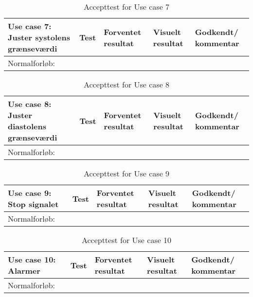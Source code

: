 \begin{table}[h!]
\caption{Accepttest for Use case 7}\label{tab:tabel8}
\begin{tabular}{|>{\raggedright\arraybackslash}p{2.5cm}| >{\raggedright\arraybackslash}p{2.9cm} | >{\raggedright\arraybackslash}p{2.9cm} | >{\raggedright\arraybackslash}p{2.9cm} | >{\raggedright\arraybackslash}p{2.8cm} |}
   \hline
   \textbf{Use case 7: Juster systolens grænseværdi } &\textbf{Test}& \textbf{Forventet resultat} & \textbf{Visuelt resultat} & \textbf{Godkendt/ kommentar}\\ \hline
   Normalforløb:& & & &\\\hline
\end{tabular}
\end{table}


\begin{table}[h!]
\caption{Accepttest for Use case 8}\label{tab:tabel8}
\begin{tabular}{|>{\raggedright\arraybackslash}p{2.5cm}| >{\raggedright\arraybackslash}p{2.9cm} | >{\raggedright\arraybackslash}p{2.9cm} | >{\raggedright\arraybackslash}p{2.9cm} | >{\raggedright\arraybackslash}p{2.8cm} |}
   \hline
   \textbf{Use case 8: Juster diastolens grænseværdi } &\textbf{Test}& \textbf{Forventet resultat} & \textbf{Visuelt resultat} & \textbf{Godkendt/ kommentar}\\ \hline
   Normalforløb:& & & &\\\hline
\end{tabular}
\end{table}

\begin{table}[h!]
\caption{Accepttest for Use case 9}\label{tab:tabel8}
\begin{tabular}{|>{\raggedright\arraybackslash}p{2.5cm}| >{\raggedright\arraybackslash}p{2.9cm} | >{\raggedright\arraybackslash}p{2.9cm} | >{\raggedright\arraybackslash}p{2.9cm} | >{\raggedright\arraybackslash}p{2.8cm} |}
   \hline
   \textbf{Use case 9: Stop signalet } &\textbf{Test}& \textbf{Forventet resultat} & \textbf{Visuelt resultat} & \textbf{Godkendt/ kommentar}\\ \hline
   Normalforløb:& & & &\\\hline
\end{tabular}
\end{table}

\begin{table}[h!]
\caption{Accepttest for Use case 10}\label{tab:tabel8}
\begin{tabular}{|>{\raggedright\arraybackslash}p{2.5cm}| >{\raggedright\arraybackslash}p{2.9cm} | >{\raggedright\arraybackslash}p{2.9cm} | >{\raggedright\arraybackslash}p{2.9cm} | >{\raggedright\arraybackslash}p{2.8cm} |}
   \hline
   \textbf{Use case 10: Alarmer } &\textbf{Test}& \textbf{Forventet resultat} & \textbf{Visuelt resultat} & \textbf{Godkendt/ kommentar}\\ \hline
   Normalforløb:& & & &\\\hline
\end{tabular}
\end{table}

